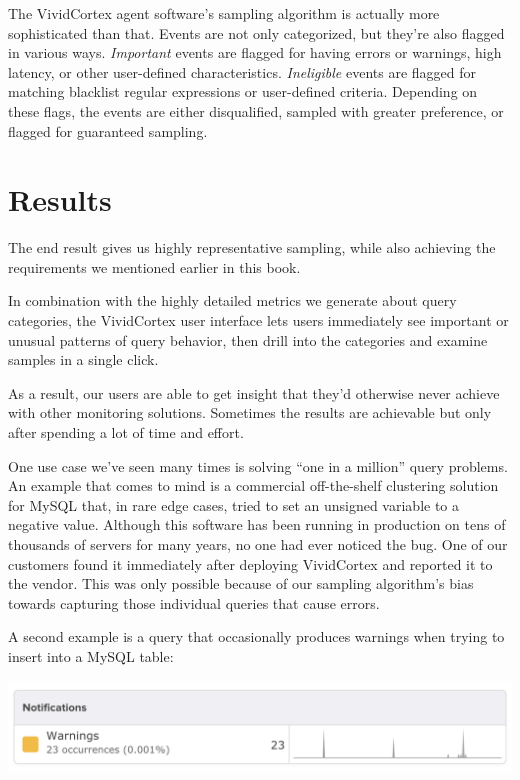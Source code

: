 \documentclass{vivid_layout}
\begin{document}
The VividCortex agent software's sampling algorithm is actually more
sophisticated than that. Events are not only categorized, but they're also
flagged in various ways.  \emph{Important} events are flagged for having errors
or warnings, high latency, or other user-defined characteristics.
\emph{Ineligible} events are flagged for matching blacklist regular expressions
or user-defined criteria. Depending on these flags, the events are either
disqualified, sampled with greater preference, or flagged for guaranteed
sampling.

\section{Results}

The end result gives us highly representative sampling, while also achieving the
requirements we mentioned earlier in this book.

In combination with the highly detailed metrics we generate about query
categories, the VividCortex user interface lets users immediately see important
or unusual patterns of query behavior, then drill into the categories and examine
samples in a single click.

As a result, our users are able to get insight that they'd otherwise never
achieve with other monitoring solutions. Sometimes the results are achievable
but only after spending a lot of time and effort.

One use case we've seen many times is solving ``one in a million'' query
problems. An example that comes to mind is a commercial off-the-shelf clustering
solution for MySQL that, in rare edge cases, tried to set an unsigned variable
to a negative value.  Although this software has been running in production on
tens of thousands of servers for many years, no one had ever noticed the bug.
One of our customers found it immediately after deploying VividCortex and
reported it to the vendor. This was only possible because of our sampling
algorithm's bias towards capturing those individual queries that cause errors.

A second example is a query that occasionally produces warnings when trying to
insert into a MySQL table:

\begin{center}
\includegraphics[width=.85\linewidth]{sketch-sampling/million}
\end{center}
\end{document}
